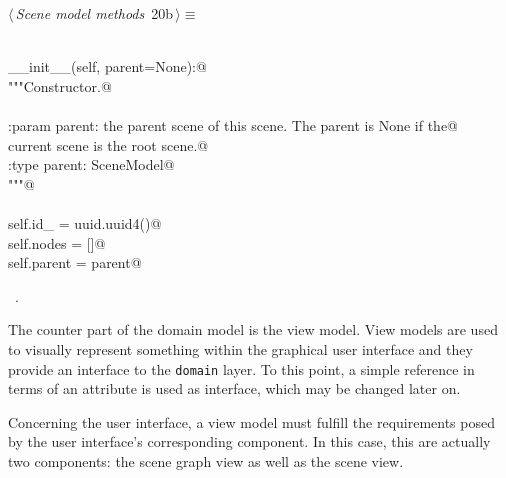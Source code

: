 \documentclass[
    a4paper,      %
    10pt,         %
    openright,    %
    notitlepage,  %
    parskip=half, %
]{scrreprt}       %
\theoremstyle{definition}                    %
\begin{document}
\begin{flushleft} \small
\begin{minipage}{\linewidth}\label{scrap13}\raggedright\small
{} $\langle\,${\itshape Scene model methods}\nobreak\ {\footnotesize {20b}}$\,\rangle\equiv$
\vspace{-1exm}
\begin{list}{}{} \item
\mbox{}\lstinline@@\\
\mbox{}\lstinline@def __init__(self, parent=None):@\\
\mbox{}\lstinline@    """Constructor.@\\
\mbox{}\lstinline@@\\
\mbox{}\lstinline@    :param parent: the parent scene of this scene. The parent is None if the@\\
\mbox{}\lstinline@                   current scene is the root scene.@\\
\mbox{}\lstinline@    :type parent: SceneModel@\\
\mbox{}\lstinline@    """@\\
\mbox{}\lstinline@@\\
\mbox{}\lstinline@    self.id_ = uuid.uuid4()@\\
\mbox{}\lstinline@    self.nodes = []@\\
\mbox{}\lstinline@    self.parent = parent@\\
\mbox{}\lstinline@@{\NWsep}
\end{list}
\vspace{-1.5ex}
\footnotesize
\begin{list}{}{\setlength{\itemsep}{-\parsep}\setlength{\itemindent}{-\leftmargin}}
\item \NWtxtMacroRefIn\ .

\item{}
\end{list}
\end{minipage}\vspace{4ex}
\end{flushleft}
The counter part of the domain model is the view model. View models are used to
visually represent something within the graphical user interface and they
provide an interface to the \verb+domain+ layer. To this point, a simple
reference in terms of an attribute is used as interface, which may be changed
later on.

Concerning the user interface, a view model must fulfill the requirements posed
by the user interface's corresponding component. In this case, this are actually
two components: the scene graph view as well as the scene view.
\end{document}

